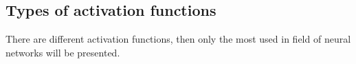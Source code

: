 \begin{itemize}
\end{itemize}

\subsection{Types of activation functions}

There are different activation functions, then only the most used in field of neural networks will be presented.


